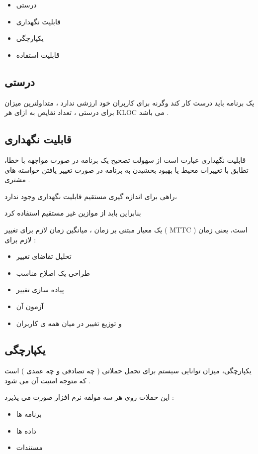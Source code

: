\documentclass{article}
\begin{document}
\begin{itemize}
	\item درستی
	\item قابلیت نگهداری
	\item یکپارچگی
	\item قابلیت استفاده
\end{itemize}


\subsection{درستی}
یک برنامه باید درست کار کند وگرنه برای کاربران خود ارزشی ندارد ، متداولترین میزان برای درستی ، تعداد نقایص به ازای هر KLOC می باشد .



\subsection{قابلیت نگهداری}
قابلیت نگهداری عبارت است از سهولت تصحیح یک برنامه در صورت مواجهه با خطا، تطابق با تغییرات محیط یا بهبود بخشیدن به برنامه در صورت تغییر یافتن خواسته های مشتری .

راهی برای اندازه گیری مستقیم قابلیت نگهداری وجود ندارد،

بنابراین باید از موازین غیر مستقیم استفاده کرد 

یک معیار مبتنی بر زمان ، میانگین زمان لازم برای تغییر ( MTTC ) است، یعنی زمان لازم برای :
\begin{itemize}
	\item تحلیل تقاضای تغییر
	\item طراحی یک اصلاح مناسب
	\item پیاده سازی تغییر
	\item آزمون آن
	\item و توزیع تغییر در میان همه ی کاربران
\end{itemize}



\subsection{یکپارچگی}
یکپارچگی، میزان توانایی سیستم برای تحمل حملاتی ( چه تصادفی و چه عمدی ) است که متوجه امنیت آن می شود .

این حملات روی هر سه مولفه نرم افزار صورت می پذیرد :

\begin{itemize}
	\item برنامه ها
	\item داده ها
	\item مستندات
\end{itemize}
\end{document}
